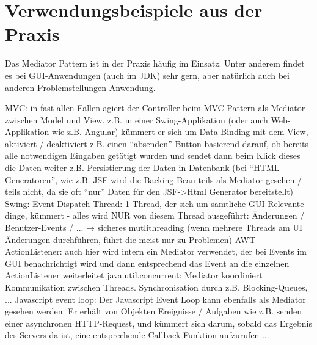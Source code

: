 \section{Verwendungsbeispiele aus der Praxis}\label{ref:VerwendungPraxis}
Das Mediator Pattern ist in der Praxis häufig im Einsatz. Unter anderem findet es bei GUI-Anwendungen (auch im JDK) sehr gern, aber natürlich auch bei anderen Problemstellungen Anwendung.
\begin{outline}
    \1 MVC: in fast allen Fällen agiert der Controller beim MVC Pattern als Mediator zwischen Model und View. z.B. in einer Swing-Applikation (oder auch Web-Applikation wie z.B. Angular) kümmert er sich um Data-Binding mit dem View, aktiviert / deaktiviert z.B. einen \enquote{absenden} Button basierend darauf, ob bereits alle notwendigen Eingaben getätigt wurden und sendet dann beim Klick dieses die Daten weiter z.B. Persistierung der Daten in Datenbank
    (bei \enquote{HTML-Generatoren}, wie z.B. JSF wird die Backing-Bean teils als Mediator gesehen / teils nicht, da sie oft \enquote{nur} Daten für den JSF->Html Generator bereitstellt)
    \1 Swing: Event Dispatch Thread: 1 Thread, der sich um sämtliche GUI-Relevante dinge, kümmert - alles wird NUR von diesem Thread ausgeführt: Änderungen / Benutzer-Events / ... → sicheres mutlithreading (wenn mehrere Threads am UI Änderungen durchführen, führt die meist nur zu Problemen)
    \1 AWT ActionListener: auch hier wird intern ein Mediator verwendet, der bei Events im GUI benachrichtigt wird und dann entsprechend das Event an die einzelnen ActionListener weiterleitet
    \1 java.util.concurrent: Mediator koordiniert Kommunikation zwischen Threads. Synchronisation durch z.B. Blocking-Queues, ...
    \1 Javascript event loop: Der Javascript Event Loop kann ebenfalls als Mediator gesehen werden. Er erhält von Objekten Ereignisse / Aufgaben wie z.B. senden einer asynchronen HTTP-Request, und kümmert sich darum, sobald das Ergebnis des Servers da ist, eine entsprechende Callback-Funktion aufzurufen
    \1 ...
\end{outline}
